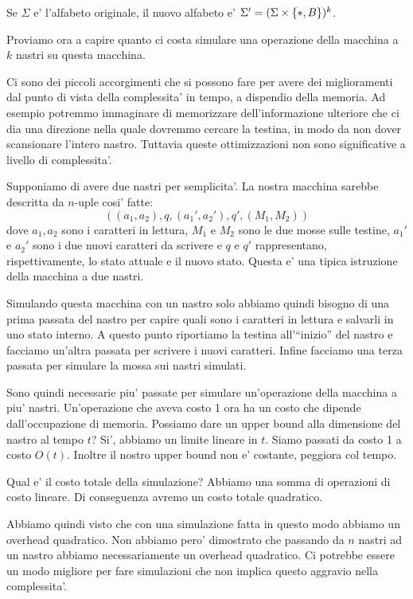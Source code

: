 Se $\Sigma$ e' l'alfabeto originale, il nuovo alfabeto e' $\Sigma' = (\Sigma \times
\{*,B\})^{k}$.

Proviamo ora a capire quanto ci costa simulare una operazione della macchina a $k$ nastri su questa
macchina.

Ci sono dei piccoli accorgimenti che si possono fare per avere dei miglioramenti dal punto di vista
della complessita' in tempo, a dispendio della memoria. Ad esempio potremmo immaginare di
memorizzare dell'informazione ulteriore che ci dia una direzione nella quale dovremmo cercare la
testina, in modo da non dover scansionare l'intero nastro. Tuttavia queste ottimizzazioni non sono
significative a livello di complessita'.

Supponiamo di avere due nastri per semplicita'. La nostra macchina sarebbe descritta da $n$-uple
cosi' fatte:
\begin{equation*}
    ((a_{1},a_{2}),q,(a_{1}',a_{2}'),q',(M_{1},M_{2}))
\end{equation*}
dove $a_{1},a_{2}$ sono i caratteri in lettura, $M_{1}$ e $M_{2}$ sono le due mosse sulle testine,
$a_{1}'$ e $a_{2}'$ sono i due nuovi caratteri da scrivere e $q$ e $q'$ rappresentano,
rispettivamente, lo stato attuale e il nuovo stato. Questa e' una tipica istruzione della macchina a
due nastri.

Simulando questa macchina con un nastro solo abbiamo quindi bisogno di una prima passata del nastro
per capire quali sono i caratteri in lettura e salvarli in uno stato interno. A questo punto
riportiamo la testina all'``inizio'' del nastro e facciamo un'altra passata per scrivere i nuovi
caratteri. Infine facciamo una terza passata per simulare la mossa sui nastri simulati.

Sono quindi necessarie piu' passate per simulare un'operazione della macchina a piu' nastri.
Un'operazione che aveva costo 1 ora ha un costo che dipende dall'occupazione di memoria. Possiamo
dare un upper bound alla dimensione del nastro al tempo $t$?  Si', abbiamo un limite lineare in $t$.
Siamo passati da costo 1 a costo $O(t)$. Inoltre il nostro upper bound non e' costante, peggiora col
tempo.

Qual e' il costo totale della simulazione? Abbiamo una somma di operazioni di costo lineare. Di
conseguenza avremo un costo totale quadratico.

Abbiamo quindi visto che con una simulazione fatta in questo modo abbiamo un overhead quadratico.
Non abbiamo pero' dimostrato che passando da $n$ nastri ad un nastro abbiamo necessariamente un
overhead quadratico. Ci potrebbe essere un modo migliore per fare simulazioni che non implica questo
aggravio nella complessita'.

